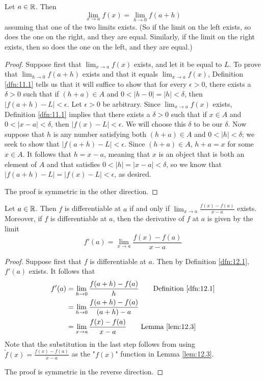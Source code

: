 \documentclass[../main.tex]{subfiles}
\begin{document}
\begin{lemma}\label{lem:12.3}
    Let $a\in\mathbb{R}$. Then
    \begin{equation*}
        \lim_{x\to a}f(x) = \lim_{h\to 0}f(a+h)
    \end{equation*}
    assuming that one of the two limits exists. (So if the limit on the left exists, so does the one on the right, and they are equal. Similarly, if the limit on the right exists, then so does the one on the left, and they are equal.)
    \begin{proof}
        Suppose first that $\lim_{x\to a}f(x)$ exists, and let it be equal to $L$. To prove that $\lim_{h\to 0}f(a+h)$ exists and that it equals $\lim_{x\to a}f(x)$, Definition \ref{dfn:11.1} tells us that it will suffice to show that for every $\epsilon>0$, there exists a $\delta>0$ such that if $(h+a)\in A$ and $0<|h-0|=|h|<\delta$, then $|f(a+h)-L|<\epsilon$. Let $\epsilon>0$ be arbitrary. Since $\lim_{x\to a}f(x)$ exists, Definition \ref{dfn:11.1} implies that there exists a $\delta>0$ such that if $x\in A$ and $0<|x-a|<\delta$, then $|f(x)-L|<\epsilon$. We will choose this $\delta$ to be our $\delta$. Now suppose that $h$ is any number satisfying both $(h+a)\in A$ and $0<|h|<\delta$; we seek to show that $|f(a+h)-L|<\epsilon$. Since $(h+a)\in A$, $h+a=x$ for some $x\in A$. It follows that $h=x-a$, meaning that $x$ is an object that is both an element of $A$ and that satisfies $0<|h|=|x-a|<\delta$, so we know that $|f(a+h)-L|=|f(x)-L|<\epsilon$, as desired.\par
        The proof is symmetric in the other direction.
    \end{proof}
\end{lemma}

\begin{theorem}\label{trm:12.4}
    Let $a\in\mathbb{R}$. Then $f$ is differentiable at $a$ if and only if $\lim_{x\to a}\frac{f(x)-f(a)}{x-a}$ exists. Moreover, if $f$ is differentiable at $a$, then the derivative of $f$ at $a$ is given by the limit
    \begin{equation*}
        f'(a) = \lim_{x\to a}\frac{f(x)-f(a)}{x-a}
    \end{equation*}
    \begin{proof}
        Suppose first that $f$ is differentiable at $a$. Then by Definition \ref{dfn:12.1}, $f'(a)$ exists. It follows that
        \begin{align*}
            f'(a) &= \lim_{h\to 0}\frac{f(a+h)-f(a)}{h}\tag*{Definition \ref{dfn:12.1}}\\
            &= \lim_{h\to 0}\frac{f(a+h)-f(a)}{(a+h)-a}\\
            &= \lim_{x\to a}\frac{f(x)-f(a)}{x-a}\tag*{Lemma \ref{lem:12.3}}
        \end{align*}
        Note that the substitution in the last step follows from using $\tilde{f}(x)=\frac{f(x)-f(a)}{x-a}$ as the "$f(x)$" function in Lemma \ref{lem:12.3}.\par
        The proof is symmetric in the reverse direction.
    \end{proof}
\end{theorem}
\end{document}
